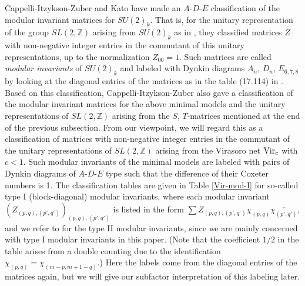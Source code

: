 \documentclass[12pt]{article}
\def\Vir{{\rm Vir}}
\def\Z{{\mathbb Z}}
\begin{document}
Cappelli-Itzykson-Zuber \cite{CIZ} and Kato \cite{Kt} have made
an $A$-$D$-$E$ classification of the modular invariant matrices
for $SU(2)_k$.  That is, for the unitary representation of the
group $SL(2,\Z)$ arising from $SU(2)_k$ as in
\cite[Subsection 17.1.1]{DMS}, they classified matrices $Z$
with non-negative integer entries in the commutant of this unitary
representations, up to the normalization $Z_{00}=1$.   Such
matrices are called {\sl modular invariants} of $SU(2)_k$ and
labeled with Dynkin diagrams $A_n$, $D_n$,
$E_{6,7,8}$ by looking at the diagonal entries of the matrices
as in the table (17.114) in \cite{DMS}.
Based on this classification, Cappelli-Itzykson-Zuber
\cite{CIZ} also gave a classification of the modular invariant
matrices for the above minimal models and the unitary representations
of $SL(2,\Z)$ arising from the $S$, $T$-matrices mentioned at the
end of the previous subsection.  From 
our viewpoint, we will regard this as a classification of matrices
with non-negative integer entries in the commutant of the unitary
representations of $SL(2,\Z)$ arising from the Virasoro net
$\Vir_c$ with $c<1$.  Such modular invariants of the minimal models
are labeled with pairs of Dynkin diagrams of $A$-$D$-$E$ type
such that the difference of their Coxeter numbers is 1.  The
classification tables are given in Table \ref{Vir-mod-I} for
so-called type I (block-diagonal) modular invariants, where each modular
invariant  $(Z_{(p,q),(p',q')})_{(p,q),(p',q')}$ is listed
in the form $\sum Z_{(p,q),(p',q')}
\chi_{(p,q)} \overline{\chi_{(p',q')}}$,
and we refer to
\cite[Table 10.4]{DMS} for the type II modular invariants, since
we are mainly concerned with type I modular invariants in this
paper.  (Note that the coefficient $1/2$ in the table arises from
a double counting due to the identification $\chi_{(p,q)}=
\chi_{(m-p,m+1-q)}$.)  Here the labels come from the diagonal entries
of the matrices again, but we will give our subfactor interpretation
of this labeling later.
\end{document}
